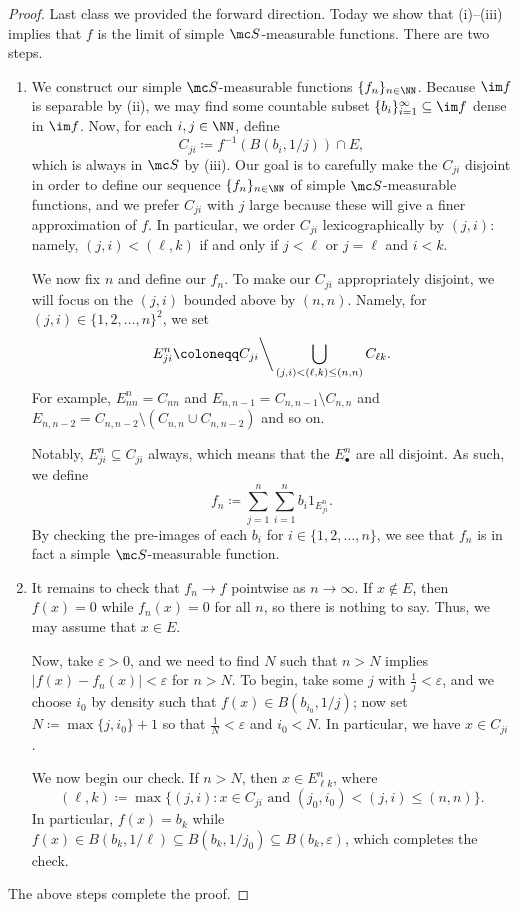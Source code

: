 \documentclass[../notes.tex]{subfiles}
\begin{document}
\begin{proof}
	Last class we provided the forward direction. Today we show that (i)--(iii) implies that $f$ is the limit of simple $\mc S$-measurable functions. There are two steps.
	\begin{enumerate}
		\item We construct our simple $\mc S$-measurable functions $\{f_n\}_{n\in\NN}$. Because $\im f$ is separable by (ii), we may find some countable subset $\{b_i\}_{i=1}^\infty\subseteq\im f$ dense in $\im f$. Now, for each $i,j\in\NN$, define
		\[C_{ji}\coloneqq f^{-1}(B(b_i,1/j))\cap E,\]
		which is always in $\mc S$ by (iii). Our goal is to carefully make the $C_{ji}$ disjoint in order to define our sequence $\{f_n\}_{n\in\NN}$ of simple $\mc S$-measurable functions, and we prefer $C_{ji}$ with $j$ large because these will give a finer approximation of $f$. In particular, we order $C_{ji}$ lexicographically by $(j,i)$: namely, $(j,i)<(\ell,k)$ if and only if $j<\ell$ or $j=\ell$ and $i<k$.
	
		We now fix $n$ and define our $f_n$. To make our $C_{ji}$ appropriately disjoint, we will focus on the $(j,i)$ bounded above by $(n,n)$. Namely, for $(j,i)\in\{1,2,\ldots,n\}^2$, we set
		\[E_{ji}^n\coloneqq C_{ji}{\mathbin\bigg\backslash}\bigcup_{(j,i)<(\ell,k)\le(n,n)}C_{\ell k}.\]
		For example, $E_{nn}^n=C_{nn}$ and $E_{n,n-1}=C_{n,n-1}\setminus C_{n,n}$ and $E_{n,n-2}=C_{n,n-2}\setminus(C_{n,n}\cup C_{n,n-2})$ and so on.
	
		Notably, $E_{ji}^n\subseteq C_{ji}$ always, which means that the $E_{\bullet}^n$ are all disjoint. As such, we define
		\[f_n\coloneqq\sum_{j=1}^n\sum_{i=1}^nb_i1_{E_{ji}^n}.\]
		By checking the pre-images of each $b_i$ for $i\in\{1,2,\ldots,n\}$, we see that $f_n$ is in fact a simple $\mc S$-measurable function.
		
		\item It remains to check that $f_n\to f$ pointwise as $n\to\infty$. If $x\notin E$, then $f(x)=0$ while $f_n(x)=0$ for all $n$, so there is nothing to say. Thus, we may assume that $x\in E$.

		Now, take $\varepsilon>0$, and we need to find $N$ such that $n>N$ implies $|f(x)-f_n(x)|<\varepsilon$ for $n>N$. To begin, take some $j$ with $\frac1j<\varepsilon$, and we choose $i_0$ by density such that $f(x)\in B(b_{i_0},1/j)$; now set $N\coloneqq\max\{j,i_0\}+1$ so that $\frac1N<\varepsilon$ and $i_0<N$. In particular, we have $x\in C_{ji}$.

		We now begin our check. If $n>N$, then $x\in E^{n}_{\ell k}$, where
		\[(\ell,k)\coloneqq\max\{(j,i):x\in C_{ji}\text{ and }(j_0,i_0)<(j,i)\le(n,n)\}.\]
		In particular, $f(x)=b_k$ while $f(x)\in B(b_k,1/\ell)\subseteq B(b_k,1/j_0)\subseteq B(b_k,\varepsilon)$, which completes the check.
	\end{enumerate}
	The above steps complete the proof.
\end{proof}
\end{document}
